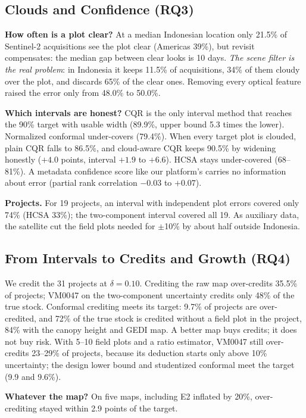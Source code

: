 \documentclass[conference,a4paper]{IEEEtran}
\begin{document}
\subsection{Clouds and Confidence (RQ3)}
\textbf{How often is a plot clear?} At a median Indonesian location only 21.5\% of Sentinel-2 acquisitions see the plot clear (Americas 39\%), but revisit compensates: the median gap between clear looks is 10 days. \emph{The scene filter is the real problem}: in Indonesia it keeps 11.5\% of acquisitions, 34\% of them cloudy over the plot, and discards 65\% of the clear ones. Removing every optical feature raised the error only from 48.0\% to 50.0\%.

\textbf{Which intervals are honest?} CQR is the only interval method that reaches the 90\% target with usable width (89.9\%, upper bound 5.3 times the lower). Normalized conformal under-covers (79.4\%). When every target plot is clouded, plain CQR falls to 86.5\%, and cloud-aware CQR keeps 90.5\% by widening honestly ($+4.0$ points, interval $+1.9$ to $+6.6$). HCSA stays under-covered (68--81\%). A metadata confidence score like our platform's carries no information about error (partial rank correlation $-0.03$ to $+0.07$).

\textbf{Projects.} For 19 projects, an interval with independent plot errors covered only 74\% (HCSA 33\%); the two-component interval covered all 19. As auxiliary data, the satellite cut the field plots needed for $\pm$10\% by about half outside Indonesia.

\subsection{From Intervals to Credits and Growth (RQ4)}
We credit the 31 projects at $\delta=0.10$. Crediting the raw map over-credits 35.5\% of projects; VM0047 on the two-component uncertainty credits only 48\% of the true stock. Conformal crediting meets its target: 9.7\% of projects are over-credited, and 72\% of the true stock is credited without a field plot in the project, 84\% with the canopy height and GEDI map. A better map buys credits; it does not buy risk. With 5--10 field plots and a ratio estimator, VM0047 still over-credits 23--29\% of projects, because its deduction starts only above 10\% uncertainty; the design lower bound and studentized conformal meet the target (9.9 and 9.6\%).

\textbf{Whatever the map?} On five maps, including E2 inflated by 20\%, over-crediting stayed within 2.9 points of the target.
\end{document}
